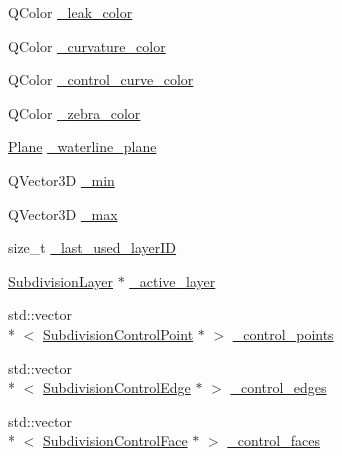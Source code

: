 \begin{DoxyCompactItemize}
Q\-Color \hyperlink{classShipCADGeometry_1_1SubdivisionSurface_a802e546e42b45b2c379490ab72391914}{\-\_\-leak\-\_\-color}
\item 
Q\-Color \hyperlink{classShipCADGeometry_1_1SubdivisionSurface_a363d17c15f29781ef200e105e72886b1}{\-\_\-curvature\-\_\-color}
\item 
Q\-Color \hyperlink{classShipCADGeometry_1_1SubdivisionSurface_a83328b441440e91ccd1793024020769c}{\-\_\-control\-\_\-curve\-\_\-color}
\item 
Q\-Color \hyperlink{classShipCADGeometry_1_1SubdivisionSurface_a26726d15987c2985f5ba16fba5c470b7}{\-\_\-zebra\-\_\-color}
\item 
\hyperlink{classShipCADGeometry_1_1Plane}{Plane} \hyperlink{classShipCADGeometry_1_1SubdivisionSurface_aaa7e9b322884649fb506848a9b4e2994}{\-\_\-waterline\-\_\-plane}
\item 
Q\-Vector3\-D \hyperlink{classShipCADGeometry_1_1SubdivisionSurface_a7318c1fbfeb1f0fbb8b2f445d607e4ef}{\-\_\-min}
\item 
Q\-Vector3\-D \hyperlink{classShipCADGeometry_1_1SubdivisionSurface_ae206a579d516760512056460b9e0237c}{\-\_\-max}
\item 
size\-\_\-t \hyperlink{classShipCADGeometry_1_1SubdivisionSurface_a9e350ce7cffd0975d03fd3bea0c95967}{\-\_\-last\-\_\-used\-\_\-layer\-I\-D}
\item 
\hyperlink{classShipCADGeometry_1_1SubdivisionLayer}{Subdivision\-Layer} $\ast$ \hyperlink{classShipCADGeometry_1_1SubdivisionSurface_a11225d0db63ff0d314dba77e0340721f}{\-\_\-active\-\_\-layer}
\item 
std\-::vector\\*
$<$ \hyperlink{classShipCADGeometry_1_1SubdivisionControlPoint}{Subdivision\-Control\-Point} $\ast$ $>$ \hyperlink{classShipCADGeometry_1_1SubdivisionSurface_a7a1119ec998a0012e11ec7dee63073fc}{\-\_\-control\-\_\-points}
\item 
std\-::vector\\*
$<$ \hyperlink{classShipCADGeometry_1_1SubdivisionControlEdge}{Subdivision\-Control\-Edge} $\ast$ $>$ \hyperlink{classShipCADGeometry_1_1SubdivisionSurface_a430ba9ceba2a6423a007ea64b4566664}{\-\_\-control\-\_\-edges}
\item 
std\-::vector\\*
$<$ \hyperlink{classShipCADGeometry_1_1SubdivisionControlFace}{Subdivision\-Control\-Face} $\ast$ $>$ \hyperlink{classShipCADGeometry_1_1SubdivisionSurface_a34b2a606532616afdba7a5f71fd9efee}{\-\_\-control\-\_\-faces}
\item 

\end{DoxyCompactItemize}
